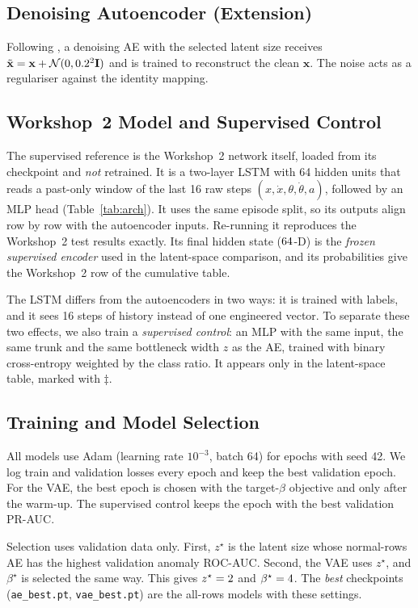 \documentclass[conference]{IEEEtran}
\begin{document}
\subsection{Denoising Autoencoder (Extension)}
Following \cite{vincent2010}, a denoising AE with the selected latent size receives
$\tilde{\mathbf x}=\mathbf x+\mathcal N(0,0.2^2\mathbf I)$ and is trained to reconstruct
the clean $\mathbf x$. The noise acts as a regulariser against the identity mapping.

\subsection{Workshop~2 Model and Supervised Control}
The supervised reference is the Workshop~2 network itself, loaded from its checkpoint and
\emph{not} retrained. It is a two-layer LSTM with 64 hidden units that reads a past-only
window of the last 16 raw steps $(x,\dot x,\theta,\dot\theta,a)$, followed by an MLP head
(Table~\ref{tab:arch}). It uses the same episode split, so its outputs align row by row with
the autoencoder inputs. Re-running it reproduces the Workshop~2 test results exactly. Its
final hidden state ($64$-D) is the \emph{frozen supervised encoder} used in the
latent-space comparison, and its probabilities give the Workshop~2 row of the cumulative
table.

The LSTM differs from the autoencoders in two ways: it is trained with labels, and it sees
16 steps of history instead of one engineered vector. To separate these two effects, we also
train a \emph{supervised control}: an MLP with the same input, the same trunk and the same
bottleneck width $z$ as the AE, trained with binary cross-entropy weighted by the class ratio.
It appears only in the latent-space table, marked with $\ddagger$.

\subsection{Training and Model Selection}
All models use Adam \cite{kingma2015} (learning rate $10^{-3}$, batch 64) for \epochs{}
epochs with seed 42. We log train and validation losses every epoch and keep the best
validation epoch. For the VAE, the best epoch is chosen with the target-$\beta$ objective and
only after the warm-up. The supervised control keeps the epoch with the best validation
PR-AUC.

Selection uses validation data only. First, $z^\star$ is the latent size whose
normal-rows AE has the highest validation anomaly ROC-AUC. Second, the VAE uses $z^\star$,
and $\beta^\star$ is selected the same way. This gives $z^\star=2$ and
$\beta^\star=4$. The \emph{best} checkpoints (\texttt{ae\_best.pt},
\texttt{vae\_best.pt}) are the all-rows models with these settings.
\end{document}
